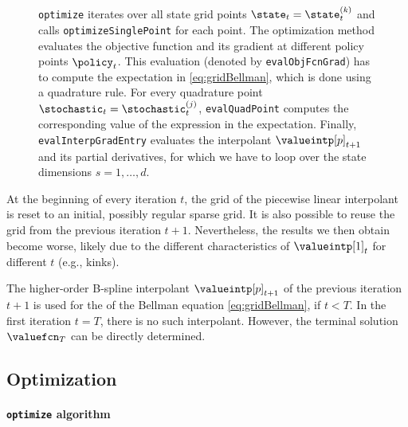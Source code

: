 \begin{figure}
{    \texttt{optimize} iterates over all state grid points
    $\state_t = \state_t^{(k)}$ and calls \texttt{optimizeSinglePoint}
    for each point.
    The optimization method evaluates the objective function and
    its gradient at different policy points $\policy_t$.
    This evaluation (denoted by \texttt{evalObjFcnGrad})
    has to compute the expectation in \cref{eq:gridBellman},
    which is done using a quadrature rule.
    For every quadrature point $\stochastic_t = \stochastic_t^{(j)}$,
    \texttt{evalQuadPoint} computes the corresponding value of
    the expression in the expectation.
    Finally, \texttt{evalInterpGradEntry} evaluates the interpolant
    $\valueintp[p]_{t+1}$ and its partial derivatives,
    for which we have to loop over the state dimensions $s = 1, \dotsc, d$.%
  }%
  \label{fig:structureSolveValueFunction}%
\end{figure}

At the beginning of every iteration $t$,
the grid of the piecewise linear interpolant is reset
to an initial, possibly regular sparse grid.
It is also possible to reuse the grid from the
previous iteration $t + 1$.
Nevertheless, the results we then obtain become worse,
likely due to the different characteristics of $\valueintp[1]_t$
for different $t$ (e.g., kinks).

The higher-order B-spline interpolant
$\valueintp[p]_{t+1}$ of the previous iteration $t+1$ is used
for the \rhs of the Bellman equation \eqref{eq:gridBellman},
if $t < T$.
In the first iteration $t = T$,
there is no such interpolant.
However,
the terminal solution $\valuefcn_T$ can be directly determined.



\subsection{Optimization}
\label{sec:823optimization}

\paragraph{\texttt{optimize} algorithm}

